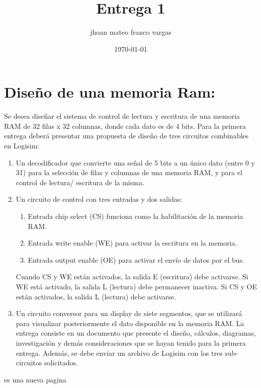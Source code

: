 \documentclass{article}
\title{Entrega 1}
\author{jhoan mateo franco vargas }
\date{\today}
\begin{document}
\maketitle
\renewcommand*\contentsname{Contenido}

\tableofcontents
\newpage


\section{Diseño de una memoria Ram:}

Se desea diseñar el sistema de control de lectura y escritura de una memoria RAM de 32 filas
x 32 columnas, donde cada dato es de 4 bits. Para la primera entrega deberá presentar una
propuesta de diseño de tres circuitos combinables en Logisim:

\begin{enumerate}
    \item Un decodificador que convierte una señal de 5 bits a un único dato (entre 0 y 31) para
la selección de filas y columnas de una memoria RAM, y para el control de lectura/
escritura de la misma.
    \item Un circuito de control con tres entradas y dos salidas:
    \begin{enumerate}
        \item Entrada chip select (CS) funciona como la habilitación de la memoria RAM.
        \item Entrada write enable (WE) para activar la escritura en la memoria.
        \item Entrada output enable (OE) para activar el envío de datos por el bus.
    \end{enumerate}
    Cuando CS y WE están activados, la salida E (escritura) debe activarse. Si WE está activado,
la salida L (lectura) debe permanecer inactiva. Si CS y OE están activados, la salida L (lectura)
debe activarse.
    \item Un circuito conversor para un display de siete segmentos, que se utilizará para visualizar
posteriormente el dato disponible en la memoria RAM.
La entrega consiste en un documento que presente el diseño, cálculos, diagramas, investigación
y demás consideraciones que se hayan tenido para la primera entrega. Además, se debe enviar
un archivo de Logisim con los tres sub-circuitos solicitados.
\end{enumerate}
\newpage
es una nueva pagina
\end{document}
